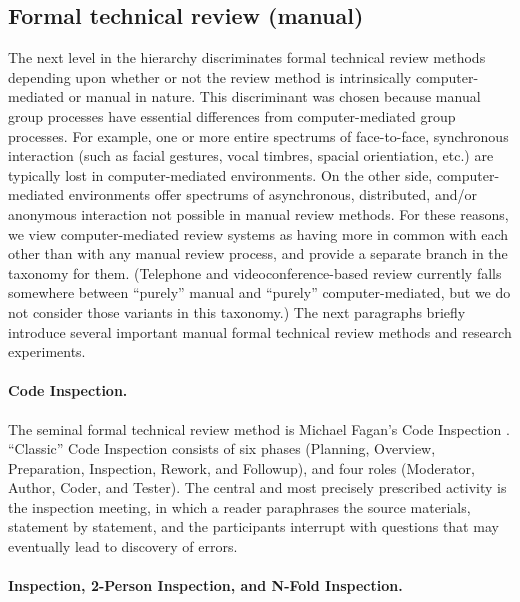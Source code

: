 \subsection*{Formal technical review (manual)}

The next level in the hierarchy discriminates formal technical review
methods depending upon whether or not the review method is intrinsically
computer-mediated or manual in nature.  This discriminant was chosen
because manual group processes have essential differences from
computer-mediated group processes. For example, one or more entire
spectrums of face-to-face, synchronous interaction (such as facial
gestures, vocal timbres, spacial orientiation, etc.) are typically lost in
computer-mediated environments.  On the other side, computer-mediated
environments offer spectrums of asynchronous, distributed, and/or anonymous
interaction not possible in manual review methods.  For these reasons, we
view computer-mediated review systems as having more in common with each
other than with any manual review process, and provide a separate branch in
the taxonomy for them. (Telephone and videoconference-based review
currently falls somewhere between ``purely'' manual and ``purely''
computer-mediated, but we do not consider those variants in this taxonomy.)
The next paragraphs briefly introduce several important manual formal
technical review methods and research experiments.


\paragraph{Code Inspection.}

The seminal formal technical review method is Michael Fagan's Code Inspection
\cite{Fagan76,Fagan86}. ``Classic'' Code Inspection consists of six phases
(Planning, Overview, Preparation, Inspection, Rework, and Followup), and
four roles (Moderator, Author, Coder, and Tester).  The central and most
precisely prescribed activity is the inspection meeting, in which a
reader paraphrases the source materials, statement by statement, and the
participants interrupt with questions that may eventually lead to discovery
of errors.

\paragraph{Inspection, 2-Person Inspection, and N-Fold Inspection.}

